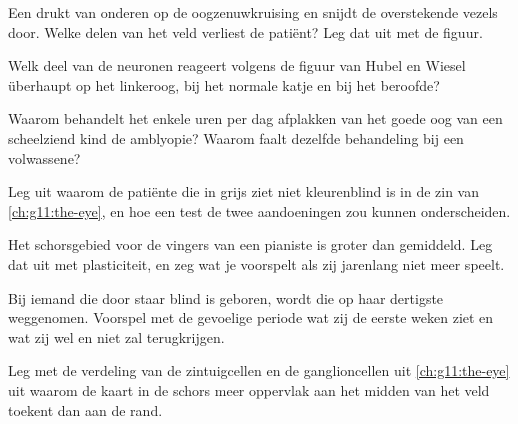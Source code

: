 \begin{exercise}[$\star\star$]\label{exo:g11:vision-and-brain:7}
Een  drukt van onderen op de oogzenuwkruising en snijdt de
overstekende vezels door. Welke delen van het veld verliest de patiënt?
Leg dat uit met de figuur.
\end{exercise}

\begin{exercise}[$\star\star$]\label{exo:g11:vision-and-brain:8}
Welk deel van de neuronen reageert volgens de figuur van Hubel en Wiesel
überhaupt op het linkeroog, bij het normale katje en bij het beroofde?
\end{exercise}

\begin{exercise}[$\star\star$]\label{exo:g11:vision-and-brain:9}
Waarom behandelt het enkele uren per dag afplakken van het goede oog van
een scheelziend kind de amblyopie? Waarom faalt dezelfde behandeling bij
een volwassene?
\end{exercise}

\begin{exercise}[$\star\star$]\label{exo:g11:vision-and-brain:10}
Leg uit waarom de patiënte die in grijs ziet niet kleurenblind is in de
zin van \cref{ch:g11:the-eye}, en hoe een test de twee aandoeningen zou
kunnen onderscheiden.
\end{exercise}

\begin{exercise}[$\star\star$]\label{exo:g11:vision-and-brain:11}
Het schorsgebied voor de vingers van een pianiste is groter dan
gemiddeld. Leg dat uit met plasticiteit, en zeg wat je voorspelt als zij
jarenlang niet meer speelt.
\end{exercise}

\begin{exercise}[$\star\star\star$]\label{exo:g11:vision-and-brain:12}
Bij iemand die door staar blind is geboren, wordt die op haar dertigste
weggenomen. Voorspel met de gevoelige periode wat zij de eerste weken
ziet en wat zij wel en niet zal terugkrijgen.
\end{exercise}

\begin{exercise}[$\star\star\star$]\label{exo:g11:vision-and-brain:13}
Leg met de verdeling van de zintuigcellen en de ganglioncellen uit
\cref{ch:g11:the-eye} uit waarom de kaart in de schors meer oppervlak aan
het midden van het veld toekent dan aan de rand.
\end{exercise}

